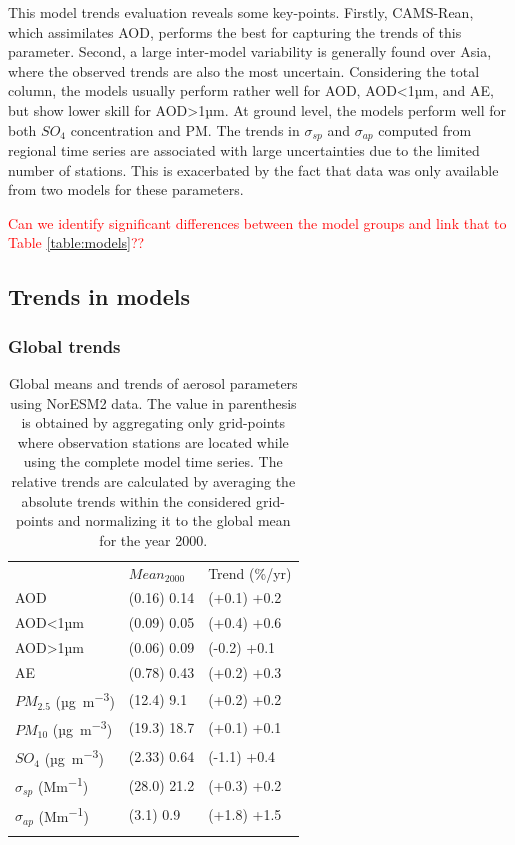 \documentclass[journal abbreviation, manuscript]{copernicus}
\begin{document}
This model trends evaluation reveals some key-points. Firstly, CAMS-Rean, which assimilates AOD, performs the best for capturing the trends of this parameter. Second, a large inter-model variability is generally found over Asia, where the observed trends are also the most uncertain.
Considering the total column, the models usually perform rather well for AOD, AOD<1µm, and AE, but show lower skill for AOD>1µm. At ground level, the models perform well for both $SO_{4}$ concentration and PM. The trends in $\sigma_{sp}$ and $\sigma_{ap}$ computed from regional time series are associated with large uncertainties due to the limited number of stations. This is exacerbated by the fact that data was only available from two models for these parameters.

\textcolor{red}{Can we identify significant differences between the model groups and link that to Table \ref{table:models}??}

\subsection{Trends in models}\label{global_trends}

\subsubsection{Global trends}

\begin{table}
 \begin{tabular}{lll}
  \tophline
                                & $Mean_{2000}$ & Trend (\%/yr) \\
  \middlehline
  AOD                           & (0.16) 0.14   & (+0.1) +0.2   \\
  AOD<1µm                       & (0.09) 0.05   & (+0.4) +0.6   \\
  AOD>1µm                       & (0.06) 0.09   & (-0.2) +0.1   \\
  AE                            & (0.78) 0.43   & (+0.2) +0.3   \\
  $PM_{2.5}$ (\unit{µg.m^{-3}}) & (12.4) 9.1    & (+0.2) +0.2   \\
  $PM_{10}$ (\unit{µg.m^{-3}})  & (19.3) 18.7   & (+0.1) +0.1   \\
  $SO_{4}$ (\unit{µg.m^{-3}})   & (2.33) 0.64   & (-1.1) +0.4   \\
  $\sigma_{sp}$ (\unit{Mm^{-1}})  & (28.0) 21.2   & (+0.3) +0.2   \\
  $\sigma_{ap}$ (\unit{Mm^{-1}})   & (3.1) 0.9     & (+1.8) +1.5   \\
  \bottomhline
 \end{tabular}
 \caption{Global means and trends of aerosol parameters using NorESM2 data. The value in parenthesis is obtained by aggregating only grid-points where observation stations are located while using the complete model time series. The relative trends are calculated by averaging the absolute trends within the considered grid-points and normalizing it to the global mean for the year 2000.}
 \label{table:global_trends}
\end{table}
\end{document}
